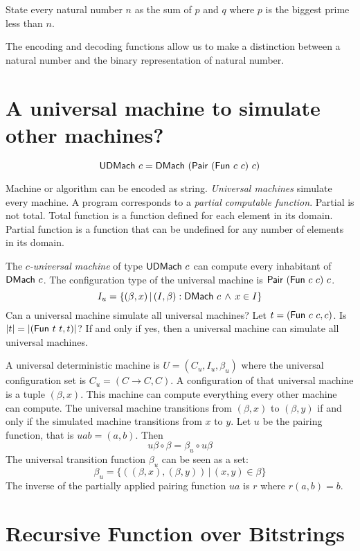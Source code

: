 State every natural number $n$ as the sum of $p$ and $q$
where $p$ is the biggest prime less than $n$.

The encoding and decoding functions allow us to make
a distinction between a natural number
and the binary representation of natural number.

\section{A universal machine to simulate other machines?}

\[
    \mathsf{UDMach}~c = \mathsf{DMach}~(\mathsf{Pair}~(\mathsf{Fun}~c~c)~c)
\]

Machine or algorithm can be encoded as string.
\emph{Universal machines} simulate every machine.
A program corresponds to a \emph{partial computable function}.
Partial is not total.
Total function is a function defined for each element in its domain.
Partial function is a function that can be undefined for any number of elements in its domain.

The \emph{$c$-universal machine} of type $\mathsf{UDMach}~c$ can compute every inhabitant of $\mathsf{DMach}~c$.
The configuration type of the universal machine is $\mathsf{Pair}~(\mathsf{Fun}~c~c)~c$.
\[
    I_u = \{ (\beta,x) \,|\, (I,\beta) : \mathsf{DMach}~c \,\wedge\, x \in I \}
\]
Can a universal machine simulate all universal machines?
Let $t = (\mathsf{Fun}~c~c,c)$.
Is $|t| = |(\mathsf{Fun}~t~t,t)|$?
If and only if yes, then a universal machine can simulate all universal machines.

A universal deterministic machine is $U = (C_u, I_u, \beta_u)$
where the universal configuration set is $C_u = (C \to C, C)$.
A configuration of that universal machine is a tuple $(\beta, x)$.
This machine can compute everything every other machine can compute.
The universal machine transitions from $(\beta, x)$ to $(\beta, y)$
if and only if the simulated machine transitions from $x$ to $y$.
Let $u$ be the pairing function, that is $uab = (a,b)$.
Then
\begin{equation}
    u \beta \circ \beta = \beta_u \circ u \beta
\end{equation}
The universal transition function $\beta_u$ can be seen as a set:
\begin{equation}
    \beta_u = \{ ((\beta,x), (\beta,y)) \,|\, (x,y) \in \beta \}
\end{equation}
The inverse of the partially applied pairing function $u a$ is $r$
where $r (a,b) = b$.

\section{Recursive Function over Bitstrings}


